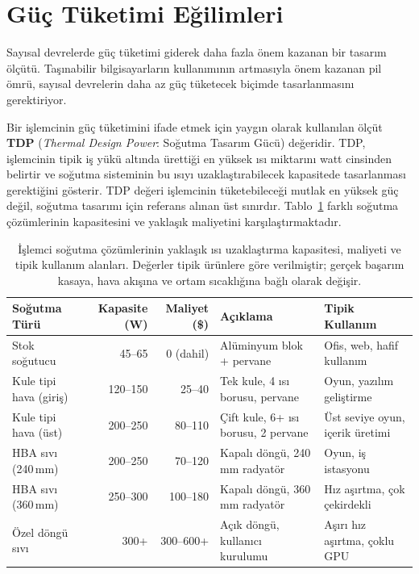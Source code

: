\section{Güç Tüketimi Eğilimleri}
\label{sec:guc-tuketimi}

Sayısal devrelerde güç tüketimi giderek daha fazla önem kazanan bir tasarım ölçütü. Taşınabilir bilgisayarların kullanımının artmasıyla önem kazanan pil ömrü, sayısal devrelerin daha az güç tüketecek biçimde tasarlanmasını gerektiriyor.

Bir işlemcinin güç tüketimini ifade etmek için yaygın olarak kullanılan ölçüt \textbf{TDP} (\emph{Thermal Design Power}: Soğutma Tasarım Gücü) değeridir. TDP, işlemcinin tipik iş yükü altında ürettiği en yüksek ısı miktarını watt cinsinden belirtir ve soğutma sisteminin bu ısıyı uzaklaştırabilecek kapasitede tasarlanması gerektiğini gösterir. TDP değeri işlemcinin tüketebileceği mutlak en yüksek güç değil, soğutma tasarımı için referans alınan üst sınırdır. Tablo~\ref{tab:sogutma-sistemleri} farklı soğutma çözümlerinin kapasitesini ve yaklaşık maliyetini karşılaştırmaktadır.

\begin{table}[ht!]
\centering
\caption[Soğutma çözümlerinin TDP kapasitesi ve maliyeti]{İşlemci soğutma çözümlerinin yaklaşık ısı uzaklaştırma kapasitesi, maliyeti ve tipik kullanım alanları. Değerler tipik ürünlere göre verilmiştir; gerçek başarım kasaya, hava akışına ve ortam sıcaklığına bağlı olarak değişir.}
\label{tab:sogutma-sistemleri}
\footnotesize
\begin{tabular}{lrrp{3.6cm}p{3.2cm}}
\toprule
\textbf{Soğutma Türü} & \textbf{Kapasite (W)} & \textbf{Maliyet (\$)} & \textbf{Açıklama} & \textbf{Tipik Kullanım} \\
\midrule
Stok soğutucu          & 45--65    & 0 (dahil)    & Alüminyum blok + pervane & Ofis, web, hafif kullanım \\
Kule tipi hava (giriş) & 120--150  & 25--40       & Tek kule, 4 ısı borusu, pervane & Oyun, yazılım geliştirme \\
Kule tipi hava (üst)   & 200--250  & 80--110      & Çift kule, 6+ ısı borusu, 2 pervane & Üst seviye oyun, içerik üretimi \\
HBA sıvı (240\,mm)     & 200--250  & 70--120      & Kapalı döngü, 240\,mm radyatör & Oyun, iş istasyonu \\
HBA sıvı (360\,mm)     & 250--300  & 100--180     & Kapalı döngü, 360\,mm radyatör & Hız aşırtma, çok çekirdekli \\
Özel döngü sıvı        & 300+      & 300--600+    & Açık döngü, kullanıcı kurulumu & Aşırı hız aşırtma, çoklu GPU \\
\bottomrule
\end{tabular}
\end{table}

